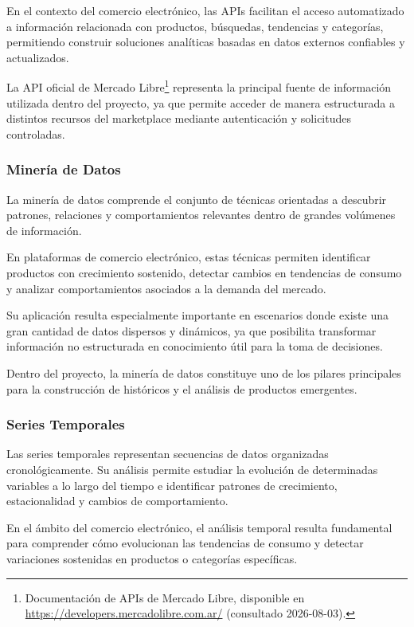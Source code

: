 En el contexto del comercio electrónico, las APIs facilitan el acceso automatizado a información relacionada con productos, búsquedas, tendencias y categorías, permitiendo construir soluciones analíticas basadas en datos externos confiables y actualizados.

La API oficial de Mercado Libre\footnote{Documentación de APIs de Mercado Libre, disponible en \url{https://developers.mercadolibre.com.ar/} (consultado 2026-08-03).} representa la principal fuente de información utilizada dentro del proyecto, ya que permite acceder de manera estructurada a distintos recursos del marketplace mediante autenticación y solicitudes controladas.

\subsubsection{Minería de Datos}

La minería de datos comprende el conjunto de técnicas orientadas a descubrir patrones, relaciones y comportamientos relevantes dentro de grandes volúmenes de información.

En plataformas de comercio electrónico, estas técnicas permiten identificar productos con crecimiento sostenido, detectar cambios en tendencias de consumo y analizar comportamientos asociados a la demanda del mercado.

Su aplicación resulta especialmente importante en escenarios donde existe una gran cantidad de datos dispersos y dinámicos, ya que posibilita transformar información no estructurada en conocimiento útil para la toma de decisiones.

Dentro del proyecto, la minería de datos constituye uno de los pilares principales para la construcción de históricos y el análisis de productos emergentes.

\subsubsection{Series Temporales}

Las series temporales representan secuencias de datos organizadas cronológicamente. Su análisis permite estudiar la evolución de determinadas variables a lo largo del tiempo e identificar patrones de crecimiento, estacionalidad y cambios de comportamiento.

En el ámbito del comercio electrónico, el análisis temporal resulta fundamental para comprender cómo evolucionan las tendencias de consumo y detectar variaciones sostenidas en productos o categorías específicas.

